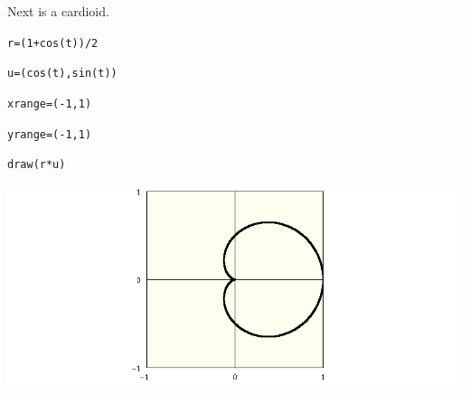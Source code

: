 \medskip
\noindent
Next is a cardioid.

\medskip
\verb$r=(1+cos(t))/2$

\verb$u=(cos(t),sin(t))$

\verb$xrange=(-1,1)$

\verb$yrange=(-1,1)$

\verb$draw(r*u)$

\medskip
\begin{center}
\includegraphics[scale=0.4]{cardioid.png}
\end{center}

